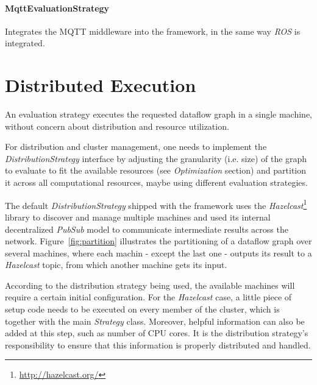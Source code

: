 \documentclass[sigplan,review,anonymous,screen]{acmart}
\begin{document}
\paragraph{MqttEvaluationStrategy} Integrates the MQTT middleware into the framework,
in the same way \textit{ROS} is integrated.

\section{Distributed Execution}

An evaluation strategy executes the requested dataflow graph in a single
machine, without concern about distribution and resource utilization.

For distribution and cluster management, one needs to implement
the \textit{DistributionStrategy} interface by adjusting the granularity (i.e. size) of
the graph to evaluate to fit the available resources (see \textit{Optimization} section)
and partition it across all computational resources, maybe using different evaluation strategies.

The default \textit{DistributionStrategy} shipped with the framework uses
the \textit{Hazelcast}\footnote{\url{http://hazelcast.org/}} library to discover and
manage multiple machines and used its internal decentralized \textit{PubSub} model to communicate
intermediate results across the network. Figure~\ref{fig:partition} illustrates
the partitioning of a dataflow graph over several machines, where each machin
- except the last one - outputs its result to a \textit{Hazelcast} topic, from which
another machine gets its input.
%

According to the distribution strategy being used, the available machines will
require a certain initial configuration. For the \textit{Hazelcast} case, a
little piece of setup code needs to be executed on every member of the cluster,
which is together with the main \textit{Strategy} class. Moreover, helpful
information can also be added at this step, such as number of CPU cores. It is
the distribution strategy's responsibility to ensure that this information is
properly distributed and handled.
\end{document}
